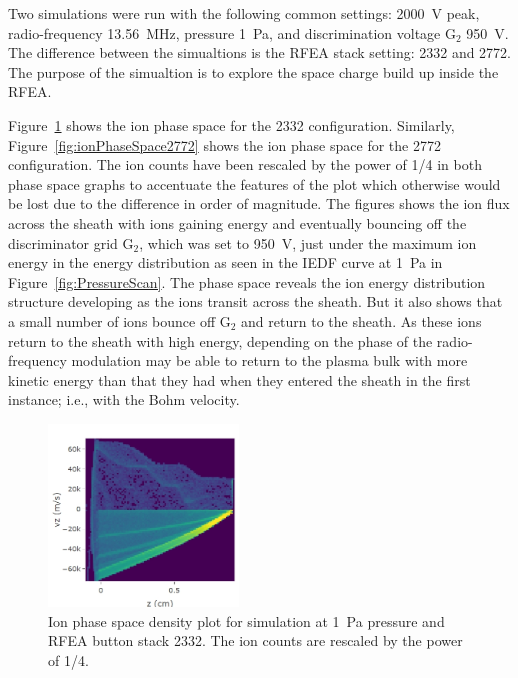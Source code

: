 Two simulations were run with the following common settings: 2000~V peak, radio-frequency 13.56~MHz, pressure 1~Pa, and discrimination voltage G$_2$ 950~V. The difference between the simualtions is the RFEA stack setting: 2332 and 2772. The purpose of the simualtion is to explore the space charge build up inside the RFEA. 

Figure~\ref{fig:ionPhaseSpace2332} shows the ion phase space for the 2332 configuration. Similarly, Figure~\ref{fig:ionPhaseSpace2772} shows the ion phase space for the 2772 configuration. The ion counts have been rescaled by the power of 1/4 in both phase space graphs to accentuate the features of the plot which otherwise would be lost due to the difference in order of magnitude. The figures shows the ion flux across the sheath with ions gaining energy and eventually bouncing off the discriminator grid G$_2$, which was set to 950~V, just under the maximum ion energy in the energy distribution as seen in the IEDF curve at 1~Pa in Figure~\ref{fig:PressureScan}. The phase space reveals the ion energy distribution structure developing as the ions transit across the sheath. But it also shows that a small number of ions bounce off G$_2$ and return to the sheath. As these ions return to the sheath with high energy, depending on the phase of the radio-frequency modulation may be able to return to the plasma bulk with more kinetic energy than that they had when they entered the sheath in the first instance; i.e., with the Bohm velocity.  

\begin{figure}[htbp]
\centering
\includegraphics[width=0.45\textwidth]{Figures/ionPhaseSpace2332.jpeg}
\caption{Ion phase space density plot for simulation at 1~Pa pressure and RFEA button stack 2332. The ion counts are rescaled by the power of 1/4. }
\label{fig:ionPhaseSpace2332}
\end{figure}

